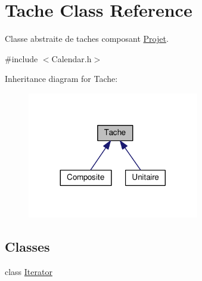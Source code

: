 \hypertarget{class_tache}{}\section{Tache Class Reference}
\label{class_tache}


Classe abstraite de taches composant \hyperlink{class_projet}{Projet}.  




{\ttfamily \#include $<$Calendar.\+h$>$}



Inheritance diagram for Tache\+:\nopagebreak
\begin{figure}[H]
\begin{center}
\leavevmode
\includegraphics[width=212pt]{class_tache__inherit__graph}
\end{center}
\end{figure}
\subsection*{Classes}
\begin{DoxyCompactItemize}
\item 
class \hyperlink{class_tache_1_1_iterator}{Iterator}
\end{DoxyCompactItemize}
